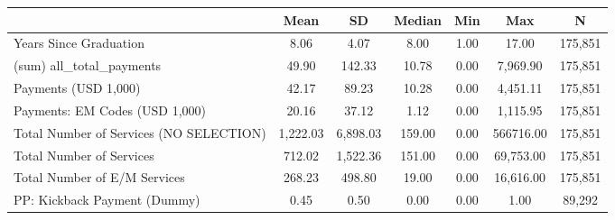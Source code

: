 {
\def\sym#1{\ifmmode^{#1}\else\(^{#1}\)\fi}
\begin{tabular}{l*{1}{cccccc}}
\hline\hline
                    &        Mean&          SD&      Median&         Min&         Max&           N\\
\hline
Years Since Graduation&        8.06&        4.07&        8.00&        1.00&       17.00&     175,851\\
(sum) all\_total\_payments&       49.90&      142.33&       10.78&        0.00&    7,969.90&     175,851\\
Payments (USD 1,000)&       42.17&       89.23&       10.28&        0.00&    4,451.11&     175,851\\
Payments: EM Codes (USD 1,000)&       20.16&       37.12&        1.12&        0.00&    1,115.95&     175,851\\
Total Number of Services (NO SELECTION)&    1,222.03&    6,898.03&      159.00&        0.00&   566716.00&     175,851\\
Total Number of Services&      712.02&    1,522.36&      151.00&        0.00&   69,753.00&     175,851\\
Total Number of E/M Services&      268.23&      498.80&       19.00&        0.00&   16,616.00&     175,851\\
PP: Kickback Payment (Dummy)&        0.45&        0.50&        0.00&        0.00&        1.00&      89,292\\
\hline\hline
\end{tabular}
}
